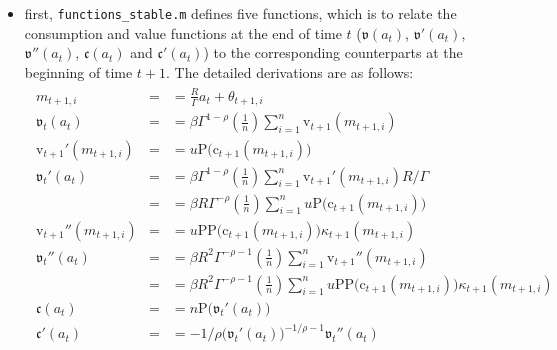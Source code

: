 \documentclass[titlepage,abstract]{\econtex}
\begin{document}
\begin{itemize}
     \item first, \texttt{functions\_stable.m} defines five functions, which is to relate the consumption and value functions at the end of time $t$ ($\ensuremath{\mathfrak{v}}(a_{t})$, $\ensuremath{\mathfrak{v}}'(a_{t})$,
            $\ensuremath{\mathfrak{v}}''(a_{t})$, $\ensuremath{\mathfrak{c}}(a_{t})$ and $\ensuremath{\mathfrak{c}}'(a_{t})$) to the corresponding counterparts at the beginning of time $t+1$. The detailed derivations are as follows:
            \begin{equation}\begin{gathered}\begin{aligned}
            m_{t+1, i}  &=& =  \frac{R}{\Gamma} {a}_{t} + \theta_{t+1, i} \\
            \ensuremath{\mathfrak{v}}_{t}(a_{t})  & = &  = \beta \Gamma^{1-\rho} \left(\frac{1}{n}\right)\sum_{i=1}^{n} \ensuremath{\mathrm{v}}_{t+1}(m_{t+1, i}) \\
            \ensuremath{\mathrm{v}}_{t+1}'(m_{t+1, i})  &=& =  u\text{P}(\ensuremath{\mathrm{c}}_{t+1}(m_{t+1, i})\big) \\
            \ensuremath{\mathfrak{v}}_{t}'(a_{t})  & = &  = \beta \Gamma^{1-\rho} \left(\frac{1}{n}\right)\sum_{i=1}^{n} \ensuremath{\mathrm{v}}_{t+1}'(m_{t+1, i}) R/\Gamma\\
             &=& =  \beta R \Gamma^{-\rho} \left(\frac{1}{n}\right)\sum_{i=1}^{n}
            u\text{P}(\ensuremath{\mathrm{c}}_{t+1}(m_{t+1, i})\big) \\
            \ensuremath{\mathrm{v}}_{t+1}''(m_{t+1, i})  &=& =  u\text{PP}\big(\ensuremath{\mathrm{c}}_{t+1}(m_{t+1, i})\big) \kappa_{t+1}(m_{t+1, i}) \\
            \ensuremath{\mathfrak{v}}_{t}''(a_{t})  & = &  = \beta R^{2} \Gamma^{-\rho-1} \left(\frac{1}{n}\right)\sum_{i=1}^{n} \ensuremath{\mathrm{v}}_{t+1}''(m_{t+1, i}) \\
             &=& =  \beta R^{2} \Gamma^{-\rho-1} \left(\frac{1}{n}\right)\sum_{i=1}^{n}
              u\text{PP}\big(\ensuremath{\mathrm{c}}_{t+1}(m_{t+1, i})\big) \ensuremath{\kappa}_{t+1}(m_{t+1, i}) \\
              \ensuremath{\mathfrak{c}}(a_{t})  &=& =  n\text{P}\big(\ensuremath{\mathfrak{v}}_{t}'(a_{t})\big) \\
              \ensuremath{\mathfrak{c}}'(a_{t})  &=& = -1/\rho \big(\ensuremath{\mathfrak{v}}_{t}'(a_{t})\big)^{-1/\rho-1} \ensuremath{\mathfrak{v}}_{t}''(a_{t}) \\

\end{aligned}
\end{gathered}
\end{equation}
\end{itemize}
\end{document}
